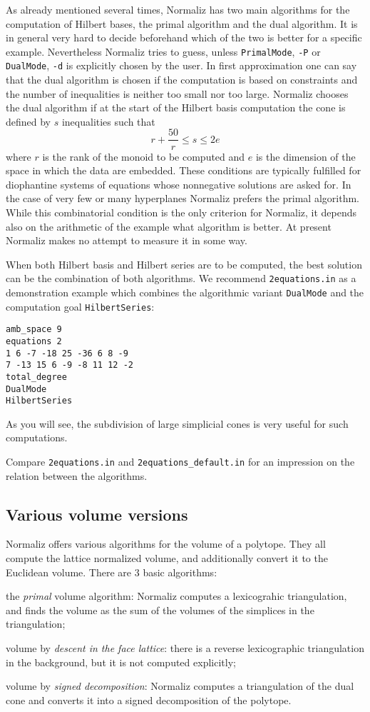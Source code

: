 As already mentioned several times, Normaliz has two main algorithms for the computation of Hilbert bases, the primal algorithm and the dual algorithm. It is in general very hard to decide beforehand which of the two is better for a specific example. Nevertheless Normaliz tries to guess, unless \verb|PrimalMode|, \verb|-P| or \verb|DualMode|, \verb|-d| is explicitly chosen by the user. In first approximation one can say that the dual algorithm is chosen if the computation is based on constraints and the number of inequalities is neither too small nor too large. Normaliz chooses the dual algorithm if at the start of the Hilbert basis computation the cone is defined by $s$ inequalities such that
$$
r+\frac{50}{r} \le s \le 2e
$$
where $r$ is the rank of the monoid to be computed and $e$ is the dimension of the space in which the data are embedded. These conditions are typically fulfilled for diophantine systems of equations whose nonnegative solutions are asked for.
In the case of very few or many hyperplanes Normaliz prefers the primal algorithm. While this combinatorial condition is the only criterion for Normaliz, it depends also on the arithmetic of the example what algorithm is better. At present Normaliz makes no attempt to measure it in some way.

When both Hilbert basis and Hilbert series are to be computed, the best solution can be the combination of both algorithms. We recommend \verb|2equations.in| as a demonstration example which combines the algorithmic variant \verb|DualMode| and the computation goal \verb|HilbertSeries|:
\begin{Verbatim}
amb_space 9
equations 2
1 6 -7 -18 25 -36 6 8 -9
7 -13 15 6 -9 -8 11 12 -2
total_degree
DualMode
HilbertSeries
\end{Verbatim}
As you will see, the subdivision of large simplicial cones is very useful for such computations.

Compare \verb|2equations.in| and \verb|2equations_default.in| for an impression on the relation between the algorithms.

\subsection{Various volume versions}\label{VariousVolumes}

Normaliz offers various algorithms for the volume of a polytope. They all compute the lattice normalized volume, and additionally convert it to the Euclidean volume. There are $3$ basic algorithms:
\begin{arab}
\item the \emph{primal} volume algorithm: Normaliz computes a lexicograhic triangulation, and finds the volume as the sum of the volumes of the simplices in the triangulation;
\item volume by \emph{descent in the face lattice}: there is a reverse lexicographic triangulation  in the background, but it is not computed explicitly;
\item volume by \emph{signed decomposition}: Normaliz computes a triangulation of the dual cone and converts it into a signed decomposition of the polytope.
\end{arab}

